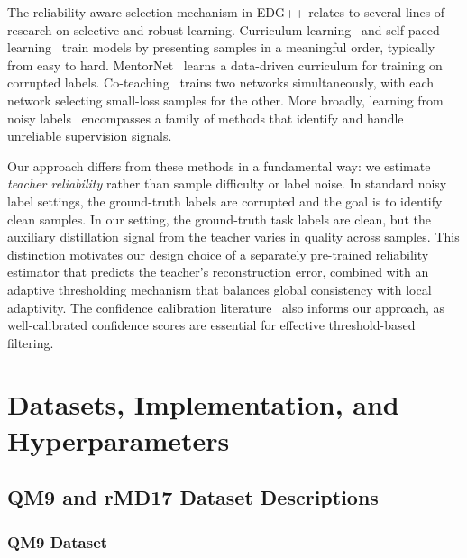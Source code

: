 The reliability-aware selection mechanism in EDG++ relates to several lines of research on selective and robust learning. Curriculum learning~\cite{bengio2009curriculum} and self-paced learning~\cite{kumar2010self} train models by presenting samples in a meaningful order, typically from easy to hard. MentorNet~\cite{jiang2018mentornet} learns a data-driven curriculum for training on corrupted labels. Co-teaching~\cite{han2018co} trains two networks simultaneously, with each network selecting small-loss samples for the other. More broadly, learning from noisy labels~\cite{song2022learning} encompasses a family of methods that identify and handle unreliable supervision signals.

Our approach differs from these methods in a fundamental way: we estimate \emph{teacher reliability} rather than sample difficulty or label noise. In standard noisy label settings, the ground-truth labels are corrupted and the goal is to identify clean samples. In our setting, the ground-truth task labels are clean, but the auxiliary distillation signal from the teacher varies in quality across samples. This distinction motivates our design choice of a separately pre-trained reliability estimator that predicts the teacher's reconstruction error, combined with an adaptive thresholding mechanism that balances global consistency with local adaptivity. The confidence calibration literature~\cite{guo2017calibration} also informs our approach, as well-calibrated confidence scores are essential for effective threshold-based filtering.


\section{Datasets, Implementation, and Hyperparameters}
\label{sec:appendix_data_impl}

\subsection{QM9 and rMD17 Dataset Descriptions}
\label{sec:appendix_datasets}

\subsubsection{QM9 Dataset}

